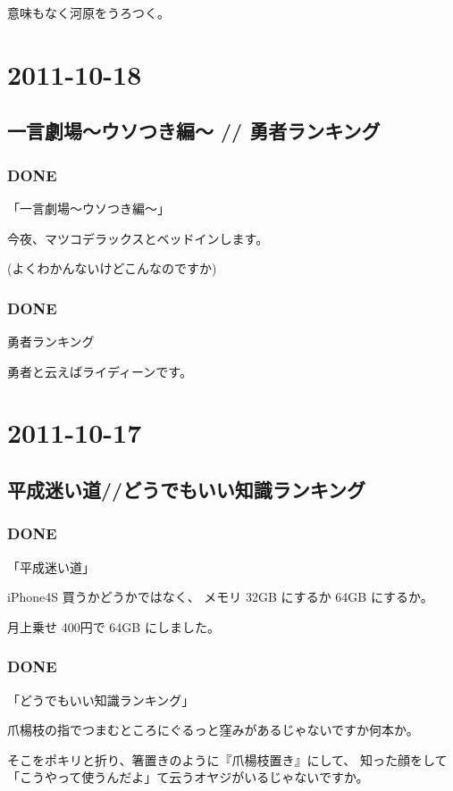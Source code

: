 \documentclass[11pt]{article}
\begin{document}
意味もなく河原をうろつく。
\section{2011-10-18}
\label{sec-55}
\subsection{一言劇場～ウソつき編～ // 勇者ランキング}
\label{sec-55_1}
\subsubsection{\textbf{DONE}}
\label{sec-55_1_1}

「一言劇場～ウソつき編～」

今夜、マツコデラックスとベッドインします。

(よくわかんないけどこんなのですか)
\subsubsection{\textbf{DONE}}
\label{sec-55_1_2}

勇者ランキング

勇者と云えばライディーンです。
\section{2011-10-17}
\label{sec-56}
\subsection{平成迷い道//どうでもいい知識ランキング}
\label{sec-56_1}
\subsubsection{\textbf{DONE}}
\label{sec-56_1_1}

「平成迷い道」

iPhone4S 買うかどうかではなく、
メモリ 32GB にするか 64GB にするか。

月上乗せ 400円で 64GB にしました。
\subsubsection{\textbf{DONE}}
\label{sec-56_1_2}

「どうでもいい知識ランキング」

爪楊枝の指でつまむところにぐるっと窪みがあるじゃないですか何本か。

そこをポキリと折り、箸置きのように『爪楊枝置き』にして、
知った顔をして「こうやって使うんだよ」て云うオヤジがいるじゃないですか。
\end{document}

